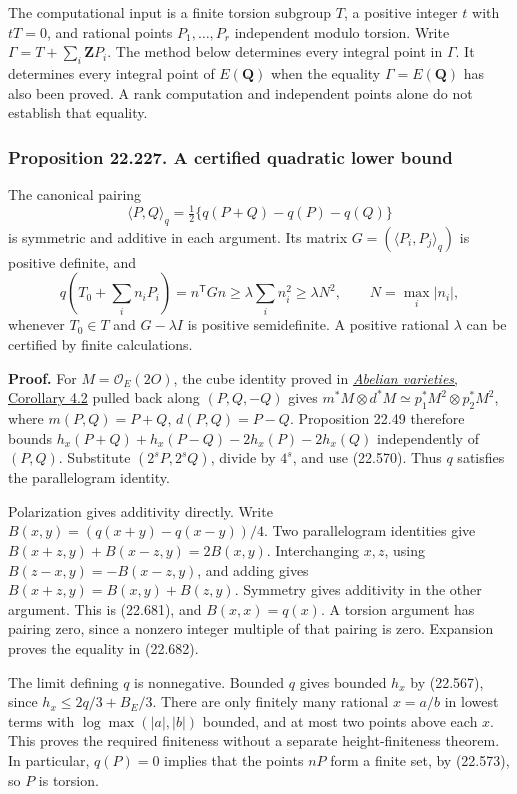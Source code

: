 \documentclass[
  11pt,
  a4paper,
]{article}
\begin{document}
The computational input is a finite torsion subgroup \(T\), a positive
integer \(t\) with \(tT=0\), and rational points \(P_1,\ldots,P_r\)
independent modulo torsion. Write \(\Gamma=T+\sum_i\mathbf ZP_i\). The
method below determines every integral point in \(\Gamma\). It
determines every integral point of \(E(\mathbf Q)\) when the equality
\(\Gamma=E(\mathbf Q)\) has also been proved. A rank computation and
independent points alone do not establish that equality.

\subsubsection{Proposition 22.227. A certified quadratic lower
bound}\label{proposition-22.227.-a-certified-quadratic-lower-bound}

The canonical pairing \[
 \langle P,Q\rangle_q
 =\tfrac12\{q(P+Q)-q(P)-q(Q)\}
 \tag{22.681}
\] is symmetric and additive in each argument. Its matrix
\(G=(\langle P_i,P_j\rangle_q)\) is positive definite, and \[
 q\left(T_0+\sum_i n_iP_i\right)=n^{\mathsf T}Gn
 \ge\lambda\sum_i n_i^2\ge\lambda N^2,
 \qquad N=\max_i|n_i|,
 \tag{22.682}
\] whenever \(T_0\in T\) and \(G-\lambda I\) is positive semidefinite. A
positive rational \(\lambda\) can be certified by finite calculations.

\textbf{Proof.} For \(M=\mathcal O_E(2O)\), the cube identity proved in
\href{https://github.com/KokunoYumeto/open-math-courses-public/blob/146dc81802e69cf262fb6cc65c1b9f74e71f4625/docs/courses/AG-GS/src/abelian-varieties.md\#4-the-theorem-of-the-cube-and-the-square}{\emph{Abelian
varieties}, Corollary 4.2} pulled back along \((P,Q,-Q)\) gives
\(m^*M\otimes d^*M\simeq p_1^*M^2\otimes p_2^*M^2\), where
\(m(P,Q)=P+Q\), \(d(P,Q)=P-Q\). Proposition 22.49 therefore bounds
\(h_x(P+Q)+h_x(P-Q)-2h_x(P)-2h_x(Q)\) independently of \((P,Q)\).
Substitute \((2^sP,2^sQ)\), divide by \(4^s\), and use (22.570). Thus
\(q\) satisfies the parallelogram identity.

Polarization gives additivity directly. Write
\(B(x,y)=(q(x+y)-q(x-y))/4\). Two parallelogram identities give
\(B(x+z,y)+B(x-z,y)=2B(x,y)\). Interchanging \(x,z\), using
\(B(z-x,y)=-B(x-z,y)\), and adding gives \(B(x+z,y)=B(x,y)+B(z,y)\).
Symmetry gives additivity in the other argument. This is (22.681), and
\(B(x,x)=q(x)\). A torsion argument has pairing zero, since a nonzero
integer multiple of that pairing is zero. Expansion proves the equality
in (22.682).

The limit defining \(q\) is nonnegative. Bounded \(q\) gives bounded
\(h_x\) by (22.567), since \(h_x\le 2q/3+B_E/3\). There are only
finitely many rational \(x=a/b\) in lowest terms with
\(\log\max(|a|,|b|)\) bounded, and at most two points above each \(x\).
This proves the required finiteness without a separate height-finiteness
theorem. In particular, \(q(P)=0\) implies that the points \(nP\) form a
finite set, by (22.573), so \(P\) is torsion.
\end{document}
